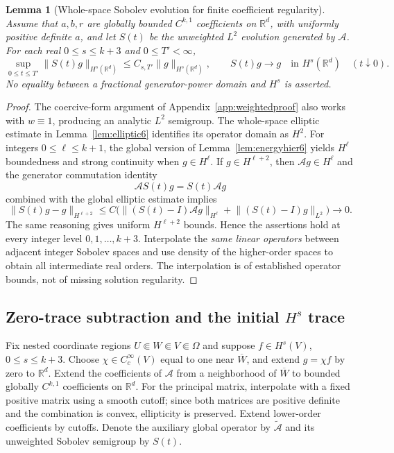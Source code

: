 \documentclass[11pt,a4paper]{article}
\newtheorem{lemma}[theorem]{Lemma}
\theoremstyle{definition}\newtheorem{definition}{Definition}[section]\newtheorem{example}[theorem]{Example}
\theoremstyle{remark}\newtheorem{remark}[theorem]{Remark}\newtheorem{remarkSix}{Remark}[section]
\newcommand{\Rd}{\mathbb R^d}
\newcommand{\Cc}{C_c^\infty}
\newcommand{\norm}[1]{\lVert #1\rVert}
\newcommand{\cA}{\mathcal A}
\begin{document}
\begin{lemma}[Whole-space Sobolev evolution for finite coefficient regularity]\label{lem:aux6}
Assume that $a,b,r$ are globally bounded $C^{k,1}$ coefficients on $\Rd$, with uniformly positive definite $a$, and let $S(t)$ be the unweighted $L^2$ evolution generated by $\cA$. For each real $0\le s\le k+3$ and $0\le T'<\infty$,
\begin{equation}\label{eq:auxB6}
 \sup_{0\le t\le T'}\norm{S(t)g}_{H^s(\Rd)}
 \le C_{s,T'}\norm g_{H^s(\Rd)},\qquad
 S(t)g\longrightarrow g\quad\text{in }H^s(\Rd)\quad(t\downarrow0).
\end{equation}
No equality between a fractional generator-power domain and $H^s$ is asserted.
\end{lemma}
\begin{proof}
The coercive-form argument of Appendix~\ref{app:weightedproof} also works with $w\equiv1$, producing an analytic $L^2$ semigroup. The whole-space elliptic estimate in Lemma~\ref{lem:elliptic6} identifies its operator domain as $H^2$. For integers $0\le\ell\le k+1$, the global version of Lemma~\ref{lem:energyhier6} yields $H^\ell$ boundedness and strong continuity when $g\in H^\ell$. If $g\in H^{\ell+2}$, then $\cA g\in H^\ell$ and the generator commutation identity
\[
 \cA S(t)g=S(t)\cA g
\]
combined with the global elliptic estimate implies
\[
 \norm{S(t)g-g}_{H^{\ell+2}}
 \le C\Big(\norm{(S(t)-I)\cA g}_{H^\ell}
             +\norm{(S(t)-I)g}_{L^2}\Big)\longrightarrow0.
\]
The same reasoning gives uniform $H^{\ell+2}$ bounds. Hence the assertions hold at every integer level $0,1,\ldots,k+3$. Interpolate the \emph{same linear operators} between adjacent integer Sobolev spaces and use density of the higher-order spaces to obtain all intermediate real orders. The interpolation is of established operator bounds, not of missing solution regularity.
\end{proof}

\subsection{Zero-trace subtraction and the initial $H^s$ trace}
\label{subsec:zerotrace6}
Fix nested coordinate regions $U\Subset W\Subset V\Subset\Omega$ and suppose $f\in H^s(V)$, $0\le s\le k+3$. Choose $\chi\in\Cc(V)$ equal to one near $\overline W$, and extend $g=\chi f$ by zero to $\Rd$. Extend the coefficients of $\cA$ from a neighborhood of $\overline W$ to bounded globally $C^{k,1}$ coefficients on $\Rd$. For the principal matrix, interpolate with a fixed positive matrix using a smooth cutoff; since both matrices are positive definite and the combination is convex, ellipticity is preserved. Extend lower-order coefficients by cutoffs. Denote the auxiliary global operator by $\widetilde{\cA}$ and its unweighted Sobolev semigroup by $S(t)$.
\end{document}
